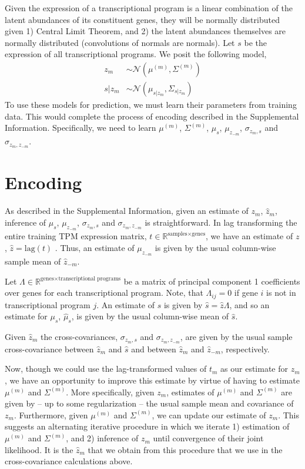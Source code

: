 \documentclass[10pt]{article}
\begin{document}
Given the expression of a transcriptional program is a linear combination of the latent abundances of its constituent genes, they will be normally distributed given 1) Central Limit Theorem, and 2) the latent abundances themselves are normally distributed (convolutions of normals are normals). Let $s$ be the expression of all transcriptional programs. We posit the following model, 
\begin{align*}
z_m & \sim \mathcal{N}\left(\mu^{(m)}, \Sigma^{(m)} \right) \\
s|z_m & \sim \mathcal{N}(\mu_{s|z_m}, \Sigma_{s|z_m}) 
\end{align*}
To use these models for prediction, we must learn their parameters from training data. This would complete the process of encoding described in the Supplemental Information. Specifically, we need to learn $\mu^{(m)}$, $\Sigma^{(m)}$, $\mu_s$, $\mu_{z_{-m}}$, $\sigma_{z_m,s}$ and $\sigma_{z_m,z_{-m}}$.

\section{Encoding} \label{inference}

As described in the Supplemental Information, given an estimate of $z_m$, $\hat{z}_{m}$, inference of $\mu_s$, $\mu_{z_{-m}}$, $\sigma_{z_m,s}$ and $\sigma_{z_m,z_{-m}}$ is straightforward. In lag transforming the entire training TPM expression matrix, $t \in \mathbb{R}^{\textrm{samples} \times \textrm{genes}}$,  we have an estimate of $z$, $\hat{z} = \textrm{lag}(t)$ \cite{Biswas2016a}. Thus, an estimate of $\mu_{z_{-m}}$ is given by the usual column-wise sample mean of $\hat{z}_{-m}$. 

Let $\Lambda \in \mathbb{R}^{\textrm{genes} \times \textrm{transcriptional programs}}$ be a matrix of principal component 1 coefficients over genes for each transcriptional program. Note, that $\Lambda_{ij} = 0$ if gene $i$ is not in transcriptional program $j$. An estimate of $s$ is given by $\hat{s} = \hat{z}\Lambda$, and so an estimate for $\mu_s$, $\hat{\mu}_s$, is given by the usual column-wise mean of $\hat{s}$. 

Given $\hat{z}_m$ the cross-covariances, $\sigma_{z_m,s}$ and $\sigma_{z_m,z_{-m}}$, are given by the usual sample cross-covariance between $\hat{z}_m$ and $\hat{s}$ and between $\hat{z}_m$ and $\hat{z}_{-m}$, respectively. 

Now, though we could use the lag-transformed values of $t_m$ as our estimate for $z_m$, we have an opportunity to improve this estimate by virtue of having to estimate $\mu^{(m)}$ and  $\Sigma^{(m)}$. More specifically, given $z_m$, estimates of $\mu^{(m)}$ and  $\Sigma^{(m)}$ are given by -- up to some regularization -- the usual sample mean and covariance of $z_m$. Furthermore, given $\mu^{(m)}$ and  $\Sigma^{(m)}$, we can update our estimate of $z_m$. This suggests an alternating iterative procedure in which we iterate 1) estimation of $\mu^{(m)}$ and  $\Sigma^{(m)}$, and 2) inference of $z_m$ until convergence of their joint likelihood. It is the $\hat{z}_m$ that we obtain from this procedure that we use in the cross-covariance calculations above.
\end{document}
